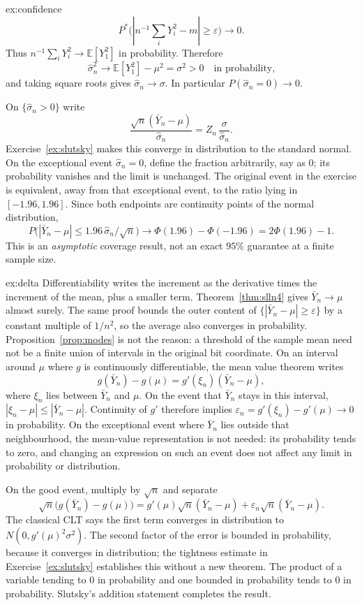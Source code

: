 \begin{solution}{ex:confidence}
\[
 P^*\bigl(|n^{-1}\sum_i Y_i^2-m|\ge\varepsilon\bigr)\to0.
\]
Thus $n^{-1}\sum_i Y_i^2\to\mathbb E[Y_1^2]$ in probability. Therefore
\[
 \hat\sigma_n^2\longrightarrow\mathbb E[Y_1^2]-\mu^2=\sigma^2>0
 \quad\text{in probability,}
\]
and taking square roots gives $\hat\sigma_n\to\sigma$. In particular $P(\hat\sigma_n=0)\to0$.

On $\{\hat\sigma_n>0\}$ write
\[
 \frac{\sqrt n(\bar Y_n-\mu)}{\hat\sigma_n}
 =Z_n\,\frac{\sigma}{\hat\sigma_n}.
\]
Exercise~\ref{ex:slutsky} makes this converge in distribution to the standard normal. On the exceptional event $\hat\sigma_n=0$, define the fraction arbitrarily, say as $0$; its probability vanishes and the limit is unchanged. The original event in the exercise is equivalent, away from that exceptional event, to the ratio lying in $[-1.96,1.96]$. Since both endpoints are continuity points of the normal distribution,
\[
 P\bigl(|\bar Y_n-\mu|\le1.96\,\hat\sigma_n/\sqrt n\bigr)
 \longrightarrow \Phi(1.96)-\Phi(-1.96)=2\Phi(1.96)-1.
\]
This is an \emph{asymptotic} coverage result, not an exact $95\%$ guarantee at a finite sample size.
\end{solution}

\begin{solution}{ex:delta}
\idea Differentiability writes the increment as the derivative times the increment of the mean, plus a smaller term.
\writeup Theorem~\ref{thm:slln4} gives $\bar Y_n\to\mu$ almost surely. The same proof bounds the outer content of $\{|\bar Y_n-\mu|\ge\varepsilon\}$ by a constant multiple of $1/n^2$, so the average also converges in probability. Proposition~\ref{prop:modes} is not the reason: a threshold of the sample mean need not be a finite union of intervals in the original bit coordinate. On an interval around $\mu$ where $g$ is continuously differentiable, the mean value theorem writes
\[
 g(\bar Y_n)-g(\mu)
 =g'(\xi_n)(\bar Y_n-\mu),
\]
where $\xi_n$ lies between $\bar Y_n$ and $\mu$. On the event that $\bar Y_n$ stays in this interval, $|\xi_n-\mu|\le|\bar Y_n-\mu|$. Continuity of $g'$ therefore implies $\varepsilon_n=g'(\xi_n)-g'(\mu)\to0$ in probability. On the exceptional event where $\bar Y_n$ lies outside that neighbourhood, the mean-value representation is not needed: its probability tends to zero, and changing an expression on such an event does not affect any limit in probability or distribution.

On the good event, multiply by $\sqrt n$ and separate
\[
 \sqrt n\bigl(g(\bar Y_n)-g(\mu)\bigr)
 =g'(\mu)\sqrt n(\bar Y_n-\mu)
 +\varepsilon_n\sqrt n(\bar Y_n-\mu).
\]
The classical CLT says the first term converges in distribution to $N(0,g'(\mu)^2\sigma^2)$. The second factor of the error is bounded in probability, because it converges in distribution; the tightness estimate in Exercise~\ref{ex:slutsky} establishes this without a new theorem. The product of a variable tending to $0$ in probability and one bounded in probability tends to $0$ in probability. Slutsky's addition statement completes the result.
\end{solution}

